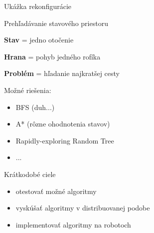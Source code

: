 \documentclass{beamer}
\begin{document}
\begin{frame}{Ukážka rekonfigurácie}
\begin{center}
\end{center}
\end{frame}

\begin{frame}{Prehľadávanie stavového priestoru}

\textbf{Stav} = jedno otočenie

\textbf{Hrana} = pohyb jedného rofíka

\textbf{Problém} = hľadanie najkratšej cesty

\pause

\vspace{1em}

Možné riešenia:
\begin{itemize}
  \item BFS (duh...)
  \item A* (rôzne ohodnotenia stavov)
  \item Rapidly-exploring Random Tree
  \item ...  
\end{itemize}

\end{frame}

\begin{frame}{Krátkodobé ciele}
\begin{itemize}
    \item otestovať možné algoritmy \pause
    \vspace{2em}
    \item vyskúšať algoritmy v distribuovanej podobe \pause
    \vspace{2em}
    \item implementovať algoritmy na robotoch
  \end{itemize}
\end{frame}
\end{document}

